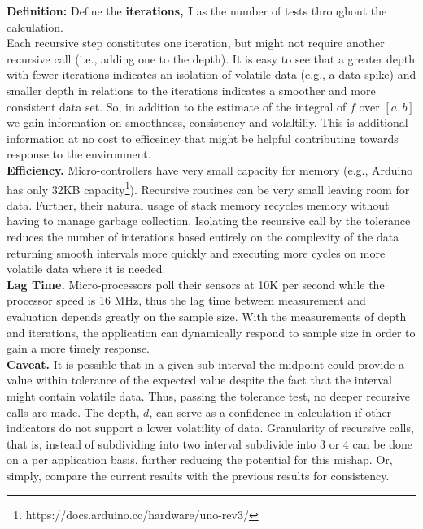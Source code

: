\documentclass[12pt,a4paper]{report}
\begin{document}
\textbf{Definition: } Define the \textbf{iterations, I} as the number of tests throughout the calculation.\\

Each recursive step constitutes one iteration, but might not require another recursive call (i.e., adding one to the depth).  It is easy to see that a greater depth with fewer iterations indicates an isolation of volatile data (e.g., a data spike) and smaller depth in relations to the iterations indicates a smoother and more consistent data set.  So, in addition to the estimate of the integral of $f$ over $[a,b]$ we gain information on smoothness, consistency and volaltiliy.  This is additional information at no cost to efficeincy that might be helpful contributing towards response to the environment.\\

\textbf{Efficiency. } Micro-controllers have very small capacity for memory (e.g., Arduino has only 32KB capacity\footnote{https://docs.arduino.cc/hardware/uno-rev3/}).  Recursive routines can be very small leaving room for data.  Further, their natural usage of stack memory recycles memory without having to manage garbage collection.  Isolating the recursive call by the tolerance reduces the number of interations based entirely on the complexity of the data returning smooth intervals more quickly and executing more cycles on more volatile data where it is needed.\\

\textbf{Lag Time. } Micro-processors poll their sensors at 10K per second while the processor speed is 16 MHz, thus the lag time between measurement and evaluation depends greatly on the sample size.  With the measurements of depth and iterations, the application can dynamically respond to sample size in order to gain a more timely response. \\

\textbf{Caveat.  } It is possible that in a given sub-interval the midpoint could provide a value within tolerance of the expected value despite the fact that the interval might contain volatile data.  Thus, passing the tolerance test, no deeper recursive calls are made.  The depth, $d$, can serve as a confidence in calculation if other indicators do not support a lower volatility of data.  Granularity of recursive calls, that is, instead of subdividing into two interval subdivide into 3 or 4 can be done on a per application basis, further reducing the potential for this mishap.  Or, simply, compare the current results with the previous results for consistency.
\end{document}
